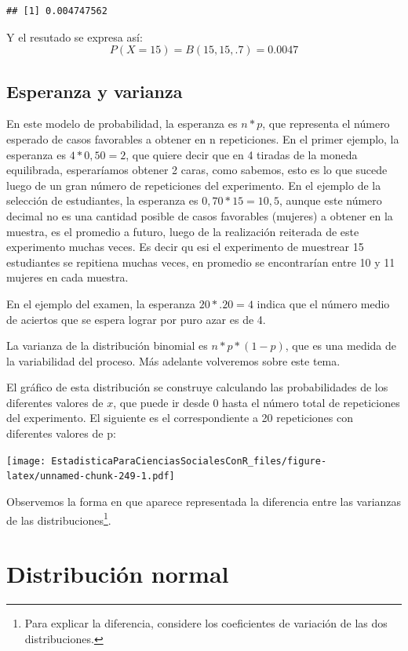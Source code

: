 \documentclass[]{book}
\let\rmarkdownfootnote\footnote%
\def\footnote{\protect\rmarkdownfootnote}
\begin{document}
\begin{verbatim}
## [1] 0.004747562
\end{verbatim}

Y el resutado se expresa así: \[P(X=15)=B(15,15,.7)=0.0047\]

\hypertarget{esperanza-y-varianza}{%
\subsection{Esperanza y varianza}\label{esperanza-y-varianza}}

En este modelo de probabilidad, la esperanza es \(n*p\), que representa
el número esperado de casos favorables a obtener en n repeticiones. En
el primer ejemplo, la esperanza es \(4*0,50=2\), que quiere decir que en 4
tiradas de la moneda equilibrada, esperaríamos obtener 2 caras, como
sabemos, esto es lo que sucede luego de un gran número de repeticiones
del experimento. En el ejemplo de la selección de estudiantes, la esperanza es \(0,70*15=10,5\), aunque este número decimal no es una cantidad posible de casos favorables (mujeres) a obtener en la muestra, es el promedio a futuro, luego de la realización reiterada de este experimento muchas veces. Es decir qu esi el experimento de muestrear 15 estudiantes se repitiena muchas veces, en promedio se encontrarían entre 10 y 11 mujeres en cada muestra.

En el ejemplo del examen, la esperanza \(20*.20=4\) indica que el número medio de aciertos que se espera lograr por puro azar es de 4.

La varianza de la distribución binomial es \(n*p*(1-p)\), que es una
medida de la variabilidad del proceso. Más adelante volveremos sobre
este tema.

El gráfico de esta distribución se construye calculando las
probabilidades de los diferentes valores de \(x\), que puede ir desde 0
hasta el número total de repeticiones del experimento. El siguiente es
el correspondiente a 20 repeticiones con diferentes valores de p:

\texttt{[image: EstadisticaParaCienciasSocialesConR\_files/figure-latex/unnamed-chunk-249-1.pdf]}

Observemos la forma en que aparece representada la diferencia entre las
varianzas de las distribuciones\footnote{Para explicar la diferencia, considere los coeficientes de
  variación de las dos distribuciones.}.

\hypertarget{distribuciuxf3n-normal}{%
\section{Distribución normal}\label{distribuciuxf3n-normal}}
\end{document}
